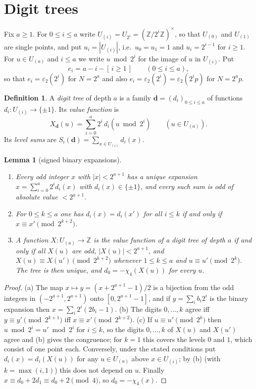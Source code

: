 \documentclass[11pt,a4paper]{article}
\newtheorem{lemma}[theorem]{Lemma}
\theoremstyle{definition}
\newtheorem{definition}[theorem]{Definition}
\theoremstyle{remark}
\newcommand{\Z}{\mathbb{Z}}
\newcommand{\Uu}[1]{U_{(#1)}}
\begin{document}
\section{Digit trees}\label{sec:trees}

Fix $a\ge1$. For $0\le i\le a$ write $\Uu i=U_{2^i}=(\Z/2^i\Z)^\times$, so that $\Uu0$ and $\Uu1$ are single points, and put $u_i=|\Uu i|$, i.e.\ $u_0=u_1=1$ and $u_i=2^{i-1}$ for $i\ge1$. For $u\in\Uu a$ and $i\le a$ we write $u\bmod 2^i$ for the image of $u$ in $\Uu i$. Put
\[
e_i=a-i-[\,i\ge1\,]\qquad(0\le i\le a),
\]
so that $e_i=\varepsilon_2(2^i)$ for $N=2^a$ and also $e_i=\varepsilon_2(2^i)=\varepsilon_2(2^ip)$ for $N=2^ap$.

\begin{definition}\label{def:tree}
A \emph{digit tree} of depth $a$ is a family $\mathbf d=(d_i)_{0\le i\le a}$ of functions $d_i\colon\Uu i\to\{\pm1\}$. Its \emph{value function} is
\[
X_{\mathbf d}(u)=\sum_{i=0}^a2^i\,d_i(u\bmod 2^i)\qquad(u\in\Uu a).
\]
Its \emph{level sums} are $S_i(\mathbf d)=\sum_{x\in\Uu i}d_i(x)$.
\end{definition}

\begin{lemma}[signed binary expansions]\label{lem:digits}
\begin{enumerate}[label=\textup{(\alph*)}]
\item Every odd integer $x$ with $|x|<2^{a+1}$ has a unique expansion $x=\sum_{i=0}^a2^id_i(x)$ with $d_i(x)\in\{\pm1\}$, and every such sum is odd of absolute value $<2^{a+1}$.
\item For $0\le k\le a$ one has $d_i(x)=d_i(x')$ for all $i\le k$ if and only if $x\equiv x'\pmod{2^{k+2}}$.
\item A function $X\colon\Uu a\to\Z$ is the value function of a digit tree of depth $a$ if and only if all $X(u)$ are odd, $|X(u)|<2^{a+1}$, and $X(u)\equiv X(u')\pmod{2^{k+2}}$ whenever $1\le k\le a$ and $u\equiv u'\pmod{2^k}$. The tree is then unique, and $d_0=-\chi_4(X(u))$ for every $u$.
\end{enumerate}
\end{lemma}

\begin{proof}
(a) The map $x\mapsto y=(x+2^{a+1}-1)/2$ is a bijection from the odd integers in $(-2^{a+1},2^{a+1})$ onto $[0,2^{a+1}-1]$, and if $y=\sum_ib_i2^i$ is the binary expansion then $x=\sum_i2^i(2b_i-1)$. (b) The digits $0,\dots,k$ agree iff $y\equiv y'\pmod{2^{k+1}}$ iff $x\equiv x'\pmod{2^{k+2}}$. (c) If $u\equiv u'\pmod{2^k}$ then $u\bmod 2^i=u'\bmod 2^i$ for $i\le k$, so the digits $0,\dots,k$ of $X(u)$ and $X(u')$ agree and (b) gives the congruence; for $k=1$ this covers the levels $0$ and $1$, which consist of one point each. Conversely, under the stated conditions put $d_i(x)=d_i(X(u))$ for any $u\in\Uu a$ above $x\in\Uu i$; by (b) (with $k=\max(i,1)$) this does not depend on $u$. Finally $x\equiv d_0+2d_1\equiv d_0+2\pmod 4$, so $d_0=-\chi_4(x)$.
\end{proof}
\end{document}
